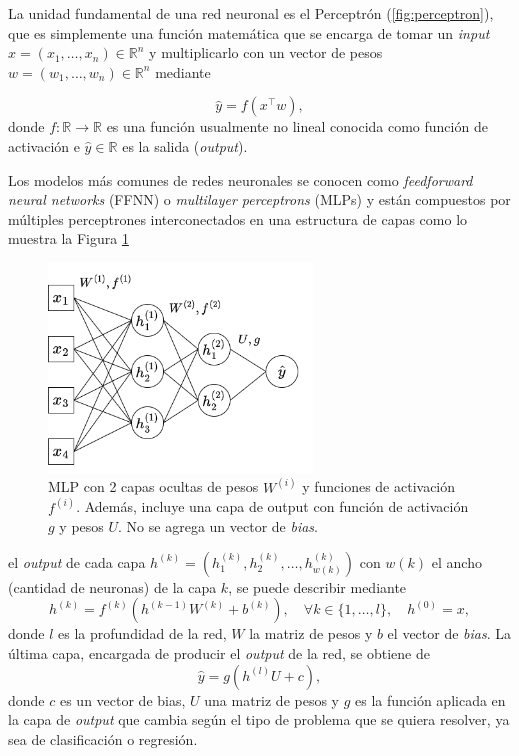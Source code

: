 \vspace{0.2cm}

La unidad fundamental de una red neuronal es el Perceptrón (\ref{fig:perceptron}), que es simplemente una función matemática que se encarga de tomar un \textit{input} $x = (x_1 , \dots , x_n) \in \mathbb{R}^n$  y multiplicarlo con un vector de pesos $w = (w_1 , \dots , w_n) \in \mathbb{R}^n$ mediante

\[
\hat{y} = f(x^{\top}w) , 
\]
donde $f: \mathbb{R} \rightarrow \mathbb{R}$ es una función usualmente no lineal conocida como función de activación e $\hat{y} \in \mathbb{R}$ es la salida (\textit{output}).  

\vspace{0.2cm}

Los modelos más comunes de redes neuronales se conocen como \textit{feedforward neural networks} (FFNN) o \textit{multilayer perceptrons} (MLPs) y están compuestos por múltiples perceptrones interconectados en una estructura de capas como lo muestra la Figura \ref{fig:MLPs}

\begin{figure}[ht]
    \centering
    \includegraphics[width=7cm]{img/tesis/MLPs.png}
    \caption{MLP con 2 capas ocultas de pesos $W^{(i)}$ y funciones de activación $f^{(i)}$. Además, incluye una capa de output con función de activación $g$ y pesos $U$. No se agrega un vector de \textit{bias}. }
    \label{fig:MLPs}
\end{figure}

\noindent el \textit{output} de cada capa $h^{(k)} = (h^{(k)}_1 , h^{(k)}_2 , \dots , h^{(k)}_{w(k)})$ con $w(k)$ el ancho (cantidad de neuronas) de la capa $k$, se puede describir mediante 
\[
h^{(k)} = f^{(k)}(h^{(k-1)}W^{(k)}  + b^{(k)} ), \quad \forall k \in \{ 1 , \dots , l \} , \quad h^{(0)} = x ,   
\]
donde $l$ es la profundidad de la red, $W$ la matriz de pesos y $b$ el vector de \textit{bias}. La última capa, encargada de producir el \textit{output} de la red, se obtiene de 
\[
\hat{y} = g(h^{(l)}U + c ) , 
\]
donde $c$ es un vector de bias, $U$ una matriz de pesos y $g$ es la función aplicada en la capa de \textit{output} que cambia según el tipo de problema que se quiera resolver, ya sea de clasificación o regresión. 

